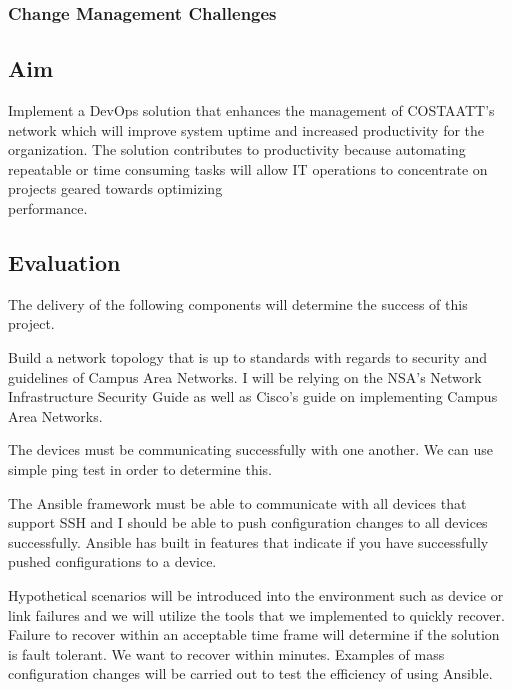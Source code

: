 \documentclass[12pt, letterpaper]{article}
\begin{document}
	\subsubsection{Change Management Challenges}


\newpage

	\subsection{Aim}
Implement a DevOps solution that enhances the management of COSTAATT's network which will improve system uptime and increased productivity for the organization. The solution contributes to productivity because automating repeatable or time consuming tasks will allow IT operations to concentrate on projects geared towards optimizing \\
performance.

\medskip


	\subsection{Evaluation}
The delivery of the following components will determine the success of this project.

\medskip

Build a network topology that is up to standards with regards to security and guidelines of Campus Area Networks. I will be relying on the NSA’s Network Infrastructure Security Guide as well as Cisco’s guide on implementing Campus Area Networks. 

\medskip

The devices must be communicating successfully with one another. We can use simple ping test in order to determine this. 

\medskip

The Ansible framework must be able to communicate with all devices that support SSH and I should be able to push configuration changes to all devices successfully. Ansible has built in features that indicate if you have successfully pushed configurations to a device. 

\medskip

Hypothetical scenarios will be introduced into the environment such as device or link failures and we will utilize the tools that we implemented to quickly recover. Failure to recover within an acceptable time frame will determine if the solution is fault tolerant. We want to recover within minutes. Examples of mass configuration changes will be carried out to test the efficiency of using Ansible. 
\end{document}
